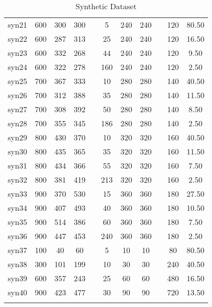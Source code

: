 \begin{table}[H]
\begin{tabular}{ccccccccccc}
        syn21 & 600 & 300 & 300 & & 5 & 240 & 240 & & 120 & 80.50\\
        syn22 & 600 & 287 & 313 & & 25 & 240 & 240 & & 120 & 16.50\\
        syn23 & 600 & 332 & 268 & & 44 & 240 & 240 & & 120 & 9.50\\
        syn24 & 600 & 322 & 278 & & 160 & 240 & 240 & & 120 & 2.50\\
        syn25 & 700 & 367 & 333 & & 10 & 280 & 280 & & 140 & 40.50\\
        syn26 & 700 & 312 & 388 & & 35 & 280 & 280 & & 140 & 11.50\\
        syn27 & 700 & 308 & 392 & & 50 & 280 & 280 & & 140 & 8.50\\
        syn28 & 700 & 355 & 345 & & 186 & 280 & 280 & & 140 & 2.50\\
        syn29 & 800 & 430 & 370 & & 10 & 320 & 320 & & 160 & 40.50\\
        syn30 & 800 & 435 & 365 & & 35 & 320 & 320 & & 160 & 11.50\\
        syn31 & 800 & 434 & 366 & & 55 & 320 & 320 & & 160 & 7.50\\
        syn32 & 800 & 381 & 419 & & 213 & 320 & 320 & & 160 & 2.50\\
        syn33 & 900 & 370 & 530 & & 15 & 360 & 360 & & 180 & 27.50\\
        syn34 & 900 & 407 & 493 & & 40 & 360 & 360 & & 180 & 10.50\\
        syn35 & 900 & 514 & 386 & & 60 & 360 & 360 & & 180 & 7.50\\
        syn36 & 900 & 447 & 453 & & 240 & 360 & 360 & & 180 & 2.50\\
        syn37 & 100 & 40 & 60 & & 5 & 10 & 10 & & 80 & 80.50\\
        syn38 & 300 & 101 & 199 & & 10 & 30 & 30 & & 240 & 40.50\\
        syn39 & 600 & 357 & 243 & & 25 & 60 & 60 & & 480 & 16.50\\
        syn40 & 900 & 423 & 477 & & 30 & 90 & 90 & & 720 & 13.50\\
        \lasthline
    \end{tabular}
    \caption{Synthetic Dataset}
    \label{tab:synthetic_dataset}
    \normalsize
\end{table}